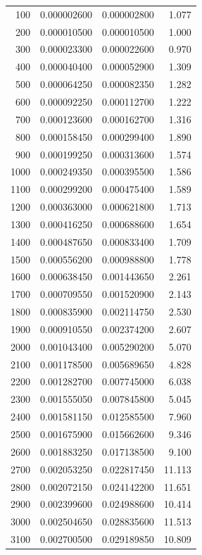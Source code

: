 \begin{longtable}{rrrr}
100  & 0.000002600 & 0.000002800 & 1.077 \\
200  & 0.000010500 & 0.000010500 & 1.000 \\
300  & 0.000023300 & 0.000022600 & 0.970 \\
400  & 0.000040400 & 0.000052900 & 1.309 \\
500  & 0.000064250 & 0.000082350 & 1.282 \\
600  & 0.000092250 & 0.000112700 & 1.222 \\
700  & 0.000123600 & 0.000162700 & 1.316 \\
800  & 0.000158450 & 0.000299400 & 1.890 \\
900  & 0.000199250 & 0.000313600 & 1.574 \\
1000 & 0.000249350 & 0.000395500 & 1.586 \\
1100 & 0.000299200 & 0.000475400 & 1.589 \\
1200 & 0.000363000 & 0.000621800 & 1.713 \\
1300 & 0.000416250 & 0.000688600 & 1.654 \\
1400 & 0.000487650 & 0.000833400 & 1.709 \\
1500 & 0.000556200 & 0.000988800 & 1.778 \\
1600 & 0.000638450 & 0.001443650 & 2.261 \\
1700 & 0.000709550 & 0.001520900 & 2.143 \\
1800 & 0.000835900 & 0.002114750 & 2.530 \\
1900 & 0.000910550 & 0.002374200 & 2.607 \\
2000 & 0.001043400 & 0.005290200 & 5.070 \\
2100 & 0.001178500 & 0.005689650 & 4.828 \\
2200 & 0.001282700 & 0.007745000 & 6.038 \\
2300 & 0.001555050 & 0.007845800 & 5.045 \\
2400 & 0.001581150 & 0.012585500 & 7.960 \\
2500 & 0.001675900 & 0.015662600 & 9.346 \\
2600 & 0.001883250 & 0.017138500 & 9.100 \\
2700 & 0.002053250 & 0.022817450 & 11.113 \\
2800 & 0.002072150 & 0.024142200 & 11.651 \\
2900 & 0.002399600 & 0.024988600 & 10.414 \\
3000 & 0.002504650 & 0.028835600 & 11.513 \\
3100 & 0.002700500 & 0.029189850 & 10.809 \\

\end{longtable}
